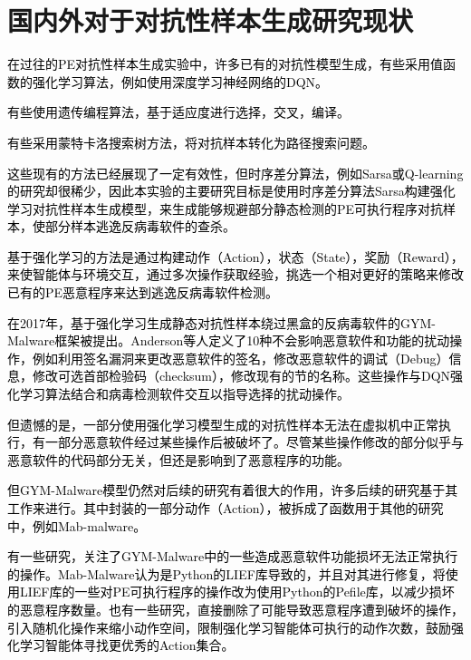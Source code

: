 \section{国内外对于对抗性样本生成研究现状}

\textcolor{black}{在过往的PE对抗性样本生成实验中，许多已有的对抗性模型生成，有些采用值函数的强化学习算法，例如使用深度学习神经网络的DQN\cite{ref9}。}

\textcolor{black}{有些使用遗传编程算法，基于适应度进行选择，交叉，编译\cite{ref10}。}

\textcolor{black}{有些采用蒙特卡洛搜索树方法，将对抗样本转化为路径搜索问题\cite{ref11}。}

\textcolor{black}{这些现有的方法已经展现了一定有效性，但时序差分算法，例如Sarsa或Q-learning的研究却很稀少，因此本实验的主要研究目标是使用时序差分算法Sarsa构建强化学习对抗性样本生成模型，来生成能够规避部分静态检测的PE可执行程序对抗样本，使部分样本逃逸反病毒软件的查杀。}

\textcolor{black}{基于强化学习的方法是通过构建动作（Action），状态（State），奖励（Reward），来使智能体与环境交互，通过多次操作获取经验，挑选一个相对更好的策略来修改已有的PE恶意程序来达到逃逸反病毒软件检测。}

\textcolor{black}{在2017年，基于强化学习生成静态对抗性样本绕过黑盒的反病毒软件的GYM-Malware框架被提出。Anderson等人定义了10种不会影响恶意软件和功能的扰动操作，例如利用签名漏洞来更改恶意软件的签名，修改恶意软件的调试（Debug）信息，修改可选首部检验码（checksum），修改现有的节的名称。这些操作与DQN强化学习算法结合和病毒检测软件交互以指导选择的扰动操作\cite{ref9}\cite{ref13}。}

\textcolor{black}{但遗憾的是，一部分使用强化学习模型生成的对抗性样本无法在虚拟机中正常执行，有一部分恶意软件经过某些操作后被破坏了。尽管某些操作修改的部分似乎与恶意软件的代码部分无关，但还是影响到了恶意程序的功能\cite{ref8}。}

\textcolor{black}{但GYM-Malware模型仍然对后续的研究有着很大的作用，许多后续的研究基于其工作来进行。其中封装的一部分动作（Action），被拆成了函数用于其他的研究中，例如Mab-malware。}

\textcolor{black}{有一些研究\cite{ref14}，关注了GYM-Malware中的一些造成恶意软件功能损坏无法正常执行的操作。Mab-Malware认为是Python的LIEF库导致的，并且对其进行修复，将使用LIEF库的一些对PE可执行程序的操作改为使用Python的Pefile库，以减少损坏的恶意程序数量。也有一些研究\cite{ref15}，直接删除了可能导致恶意程序遭到破坏的操作，引入随机化操作来缩小动作空间，限制强化学习智能体可执行的动作次数，鼓励强化学习智能体寻找更优秀的Action集合。}

